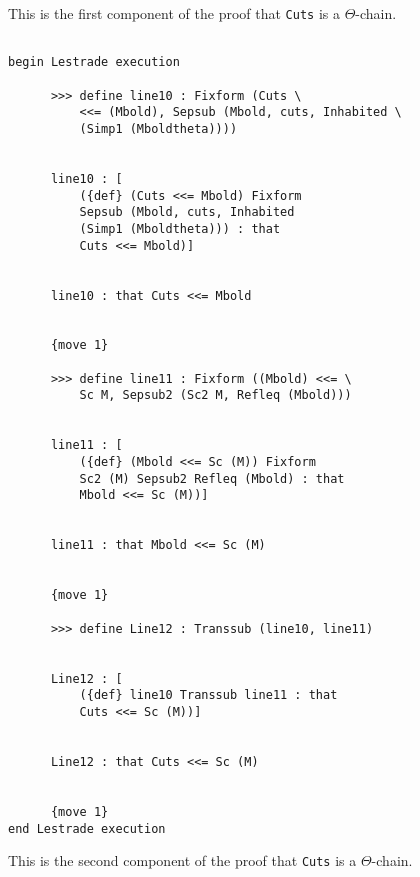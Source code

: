 \documentclass[12pt]{article}
\begin{document}
This is the first component of the proof that {\tt Cuts} is a $\Theta$-chain.

\begin{verbatim}

begin Lestrade execution

      >>> define line10 : Fixform (Cuts \
          <<= (Mbold), Sepsub (Mbold, cuts, Inhabited \
          (Simp1 (Mboldtheta))))


      line10 : [
          ({def} (Cuts <<= Mbold) Fixform 
          Sepsub (Mbold, cuts, Inhabited 
          (Simp1 (Mboldtheta))) : that 
          Cuts <<= Mbold)]


      line10 : that Cuts <<= Mbold


      {move 1}

      >>> define line11 : Fixform ((Mbold) <<= \
          Sc M, Sepsub2 (Sc2 M, Refleq (Mbold)))


      line11 : [
          ({def} (Mbold <<= Sc (M)) Fixform 
          Sc2 (M) Sepsub2 Refleq (Mbold) : that 
          Mbold <<= Sc (M))]


      line11 : that Mbold <<= Sc (M)


      {move 1}

      >>> define Line12 : Transsub (line10, line11)


      Line12 : [
          ({def} line10 Transsub line11 : that 
          Cuts <<= Sc (M))]


      Line12 : that Cuts <<= Sc (M)


      {move 1}
end Lestrade execution
\end{verbatim}

This is the second component of the proof that {\tt Cuts} is a $\Theta$-chain.
\end{document}
